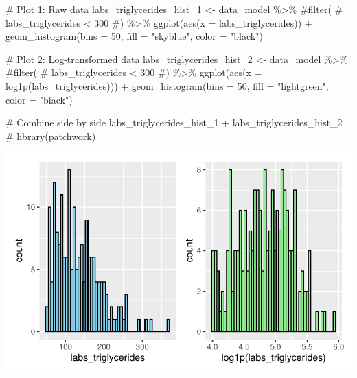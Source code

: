 \documentclass[
  12pt,
]{article}
\newenvironment{Shaded}{\begin{snugshade}}{\end{snugshade}}
\newcommand{\AttributeTok}[1]{\textcolor[rgb]{0.40,0.45,0.13}{#1}}
\newcommand{\CommentTok}[1]{\textcolor[rgb]{0.37,0.37,0.37}{#1}}
\newcommand{\DecValTok}[1]{\textcolor[rgb]{0.68,0.00,0.00}{#1}}
\newcommand{\FunctionTok}[1]{\textcolor[rgb]{0.28,0.35,0.67}{#1}}
\newcommand{\NormalTok}[1]{\textcolor[rgb]{0.00,0.23,0.31}{#1}}
\newcommand{\OtherTok}[1]{\textcolor[rgb]{0.00,0.23,0.31}{#1}}
\newcommand{\SpecialCharTok}[1]{\textcolor[rgb]{0.37,0.37,0.37}{#1}}
\newcommand{\StringTok}[1]{\textcolor[rgb]{0.13,0.47,0.30}{#1}}
\begin{document}
\begin{Shaded}
\begin{Highlighting}[]
\CommentTok{\# Plot 1: Raw data}
\NormalTok{labs\_triglycerides\_hist\_1 }\OtherTok{\textless{}{-}}\NormalTok{ data\_model }\SpecialCharTok{\%\textgreater{}\%} 
    \CommentTok{\#filter(}
    \CommentTok{\#    labs\_triglycerides \textless{} 300}
    \CommentTok{\#) \%\textgreater{}\% }
    \FunctionTok{ggplot}\NormalTok{(}\FunctionTok{aes}\NormalTok{(}\AttributeTok{x =}\NormalTok{ labs\_triglycerides)) }\SpecialCharTok{+} 
    \FunctionTok{geom\_histogram}\NormalTok{(}\AttributeTok{bins =} \DecValTok{50}\NormalTok{, }\AttributeTok{fill =} \StringTok{"skyblue"}\NormalTok{, }\AttributeTok{color =} \StringTok{"black"}\NormalTok{)}

\CommentTok{\# Plot 2: Log{-}transformed data}
\NormalTok{labs\_triglycerides\_hist\_2 }\OtherTok{\textless{}{-}}\NormalTok{ data\_model }\SpecialCharTok{\%\textgreater{}\%} 
    \CommentTok{\#filter(}
    \CommentTok{\#    labs\_triglycerides \textless{} 300}
    \CommentTok{\#) \%\textgreater{}\%}
    \FunctionTok{ggplot}\NormalTok{(}\FunctionTok{aes}\NormalTok{(}\AttributeTok{x =} \FunctionTok{log1p}\NormalTok{(labs\_triglycerides))) }\SpecialCharTok{+} 
    \FunctionTok{geom\_histogram}\NormalTok{(}\AttributeTok{bins =} \DecValTok{50}\NormalTok{, }\AttributeTok{fill =} \StringTok{"lightgreen"}\NormalTok{, }\AttributeTok{color =} \StringTok{"black"}\NormalTok{)}

\CommentTok{\# Combine side by side}
\NormalTok{labs\_triglycerides\_hist\_1 }\SpecialCharTok{+}\NormalTok{ labs\_triglycerides\_hist\_2 }\CommentTok{\# library(patchwork)}
\end{Highlighting}
\end{Shaded}

\includegraphics{Outcomes_files/figure-pdf/labs_triglycerides_1-1.pdf}
\end{document}
